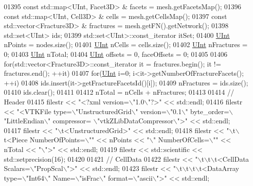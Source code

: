 \begin{DoxyCode}
01395     \textcolor{keyword}{const} std::map<UInt, Facet3D> & facets = mesh.getFacetsMap();
01396     \textcolor{keyword}{const} std::map<UInt, Cell3D> & cells = mesh.getCellsMap();
01397     \textcolor{keyword}{const} std::vector<Fracture3D> & fractures = mesh.getFN().getNetwork();
01398     std::set<UInt> ids;
01399     std::set<UInt>::const\_iterator itSet;
01400     \hyperlink{namespaceFVCode3D_a4bf7e328c75d0fd504050d040ebe9eda}{UInt} nPoints = nodes.size();
01401     \hyperlink{namespaceFVCode3D_a4bf7e328c75d0fd504050d040ebe9eda}{UInt} nCells = cells.size();
01402     \hyperlink{namespaceFVCode3D_a4bf7e328c75d0fd504050d040ebe9eda}{UInt} nFractures = 0;
01403     \hyperlink{namespaceFVCode3D_a4bf7e328c75d0fd504050d040ebe9eda}{UInt} nTotal;
01404     \hyperlink{namespaceFVCode3D_a4bf7e328c75d0fd504050d040ebe9eda}{UInt} offsets = 0, faceOffsets = 0;
01405 
01406     \textcolor{keywordflow}{for}(std::vector<Fracture3D>::const\_iterator it = fractures.begin(); it != fractures.end(); ++it)
01407         \textcolor{keywordflow}{for}(\hyperlink{namespaceFVCode3D_a4bf7e328c75d0fd504050d040ebe9eda}{UInt} i=0; i<it->getNumberOfFractureFacets(); ++i)
01408           ids.insert(it->getFractureFacetsId()[i]);
01409     nFractures = ids.size();
01410     ids.clear();
01411 
01412     nTotal = nCells + nFractures;
01413 
01414     \textcolor{comment}{// Header}
01415     filestr << \textcolor{stringliteral}{"<?xml version=\(\backslash\)"1.0\(\backslash\)"?>"} << std::endl;
01416     filestr << \textcolor{stringliteral}{"<VTKFile type=\(\backslash\)"UnstructuredGrid\(\backslash\)" version=\(\backslash\)"0.1\(\backslash\)" byte\_order=\(\backslash\)"LittleEndian\(\backslash\)" compressor=
      \(\backslash\)"vtkZLibDataCompressor\(\backslash\)">"} << std::endl;
01417     filestr << \textcolor{stringliteral}{"\(\backslash\)t<UnstructuredGrid>"} << std::endl;
01418     filestr << \textcolor{stringliteral}{"\(\backslash\)t\(\backslash\)t<Piece NumberOfPoints=\(\backslash\)""} << nPoints << \textcolor{stringliteral}{"\(\backslash\)" NumberOfCells=\(\backslash\)""} << nTotal << \textcolor{stringliteral}{"\(\backslash\)">"} << 
      std::endl;
01419     filestr << std::scientific << std::setprecision(16);
01420 
01421     \textcolor{comment}{// CellData}
01422     filestr << \textcolor{stringliteral}{"\(\backslash\)t\(\backslash\)t\(\backslash\)t<CellData Scalars=\(\backslash\)"PropScal\(\backslash\)">"} << std::endl;
01423     filestr << \textcolor{stringliteral}{"\(\backslash\)t\(\backslash\)t\(\backslash\)t\(\backslash\)t<DataArray type=\(\backslash\)"Int64\(\backslash\)" Name=\(\backslash\)"isFrac\(\backslash\)" format=\(\backslash\)"ascii\(\backslash\)">"} << std::endl;

\end{DoxyCode}
